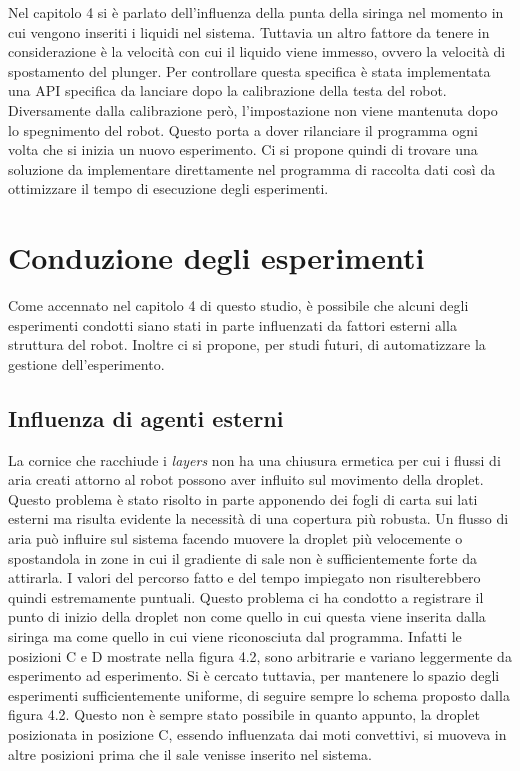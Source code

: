 Nel capitolo 4 si è parlato dell'influenza della punta della siringa nel momento in cui vengono inseriti i liquidi nel sistema. Tuttavia un altro fattore da tenere in considerazione è la velocità con cui il liquido viene immesso, ovvero la velocità di spostamento del plunger. Per controllare questa specifica è stata implementata una API specifica da lanciare dopo la calibrazione della testa del robot. Diversamente dalla calibrazione però, l'impostazione non viene mantenuta dopo lo spegnimento del robot. Questo porta a dover rilanciare il programma ogni volta che si inizia un nuovo esperimento. Ci si propone quindi di trovare una soluzione da implementare direttamente nel programma di raccolta dati così da ottimizzare il tempo di esecuzione degli esperimenti.  

\section{Conduzione degli esperimenti}
\label{sec:123}
Come accennato nel capitolo 4 di questo studio, è possibile che alcuni degli esperimenti condotti siano stati in parte influenzati da fattori esterni alla struttura del robot. Inoltre ci si propone, per studi futuri, di automatizzare la gestione dell'esperimento.
 
\subsection{Influenza di agenti esterni} 
La cornice che racchiude i \emph{layers} non ha una chiusura ermetica per cui i flussi di aria creati attorno al robot possono aver influito sul movimento della droplet. Questo problema è stato risolto in parte apponendo dei fogli di carta sui lati esterni ma risulta evidente la necessità di una copertura più robusta. Un flusso di aria può influire sul sistema facendo muovere la droplet più velocemente o spostandola in zone in cui il gradiente di sale non è sufficientemente forte da attirarla. I valori del percorso fatto e del tempo impiegato non risulterebbero quindi estremamente puntuali. 
Questo problema ci ha condotto a registrare il punto di inizio della droplet non come quello in cui questa viene inserita dalla siringa ma come quello in cui viene riconosciuta dal programma.  
Infatti le posizioni C e D mostrate nella figura 4.2, sono arbitrarie e variano leggermente da esperimento ad esperimento. Si è cercato tuttavia, per mantenere lo spazio degli esperimenti sufficientemente uniforme, di seguire sempre lo schema proposto dalla figura 4.2. Questo non è sempre stato possibile in quanto appunto, la droplet posizionata in posizione C, essendo influenzata dai moti convettivi, si muoveva in altre posizioni prima che il sale venisse inserito nel sistema. 


